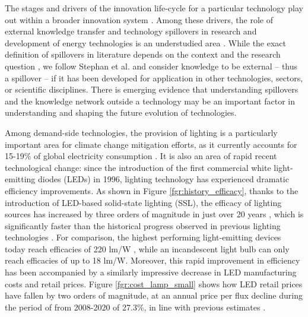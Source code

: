 \documentclass[twoside,twocolumn,9pt]{article}
\begin{document}
 
The stages and drivers of the innovation life-cycle for a particular technology play out within a broader innovation system \cite{grubler2012policies}\cite{Anadon2016}. Among these drivers, the role of external  knowledge transfer and technology spillovers in research and development of energy technologies is an understudied area  \cite{Stephan2021}. While the exact definition of spillovers in literature depends on the context and the research question \cite{Liu2003}\cite{Nemet2012}, we follow Stephan et al. \cite{Stephan2021} and consider knowledge to be external – thus a spillover –  if it has been developed for application in other technologies, sectors, or scientific disciplines. There is emerging evidence that understanding spillovers and the knowledge network outside a technology may be an important factor in understanding \cite{Pichler2020} and shaping \cite{Clark2016}\cite{Stephan2021}\cite{Sun2021}\cite{kolesnikov_framework_2022} the future evolution of technologies.  

Among demand-side technologies, the provision of lighting is a particularly important area for climate change mitigation efforts, as it currently   accounts for 15-19\% of global electricity consumption \cite{Zissis2016}\cite{doe_electricity}. It is also an area of rapid recent technological change: since the introduction of the first commercial white light-emitting diodes (LEDs) in 1996, lighting technology has experienced dramatic efficiency improvements.  As shown in Figure \ref{fgr:history_efficacy}, thanks to the introduction of LED-based solid-state lighting (SSL), the efficacy of lighting sources has increased by three orders of magnitude in just over 20 years , which is significantly faster than the historical progress observed in previous lighting technologies \cite{weinold2021quantifying}. For comparison, the highest performing light-emitting devices today reach efficacies of 220 lm/W \cite{lumistrips2021mid}, while an incandescent light bulb can only reach efficacies of up to 18 lm/W. Moreover, this rapid improvement in efficiency has been accompanied by a similarly impressive decrease in LED manufacturing costs and retail prices. Figure \ref{fgr:cost_lamp_small} shows how LED retail prices have fallen by two orders of magnitude, at an annual price per flux decline during the period of from 2008-2020 of 27.3\%, in line with previous estimates \cite{Gerke2020}.  
\end{document}
